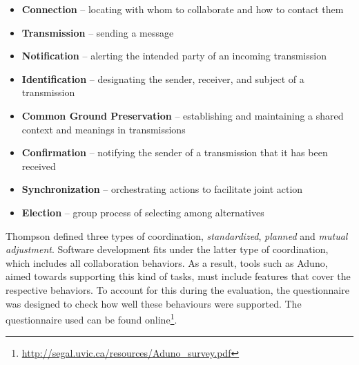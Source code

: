 \documentclass[conference]{IEEEtran}
\begin{document}
\begin{itemize}
\item \textbf{Connection} -- locating with whom to collaborate and how to contact them
\item \textbf{Transmission} -- sending a message
\item \textbf{Notification} -- alerting the intended party of an incoming transmission
\item \textbf{Identification} -- designating the sender, receiver, and subject of a transmission
\item \textbf{Common Ground Preservation} -- establishing and maintaining a shared context and meanings in transmissions
\item \textbf{Confirmation} -- notifying the sender of a transmission that it has been received
\item \textbf{Synchronization} -- orchestrating actions to facilitate joint action
\item \textbf{Election} -- group process of selecting among alternatives
\end{itemize}

Thompson \cite{Thompson67} defined three types of coordination, \textit{standardized}, \textit{planned} and \textit{mutual adjustment}. Software development fits under the latter type of coordination, which includes all collaboration behaviors. As a result, tools such as Aduno, aimed towards supporting this kind of tasks, must include features that cover the respective behaviors. To account for this during the evaluation, the questionnaire was designed to check how well these behaviours were supported. The questionnaire used can be found online\footnote{\url{http://segal.uvic.ca/resources/Aduno_survey.pdf}}.
\end{document}
